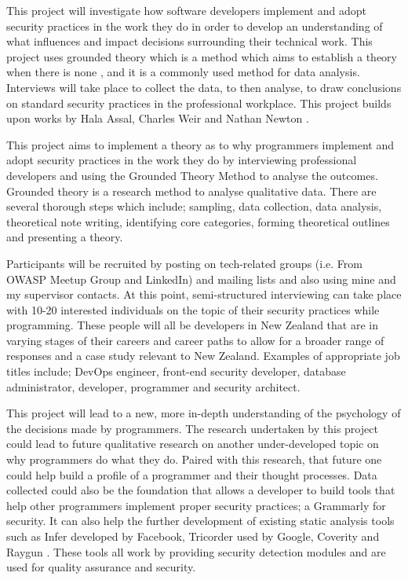 \newline
\par This project will investigate how software developers implement and adopt security practices in the work they do in order to develop an understanding of what influences and impact decisions surrounding their technical work. This project uses grounded theory which is a method which aims to establish a theory when there is none \cite{2}, and it is a commonly used method for data analysis. Interviews will take place to collect the data, to then analyse, to draw conclusions on standard security practices in the professional workplace. This project builds upon works by Hala Assal, Charles Weir and Nathan Newton \cite{summary1, 1, nathan}. 
\newline
\par This project aims to implement a theory as to why programmers implement and adopt security practices in the work they do by interviewing professional developers and using the Grounded Theory Method to analyse the outcomes. Grounded theory is a research method to analyse qualitative data. There are several thorough steps which include; sampling, data collection, data analysis, theoretical note writing, identifying core categories, forming theoretical outlines and presenting a theory.
\newline
\par Participants will be recruited by posting on tech-related groups (i.e. From OWASP Meetup Group and LinkedIn) and mailing lists and also using mine and my supervisor contacts. At this point, semi-structured interviewing can take place with 10-20 interested individuals on the topic of their security practices while programming. These people will all be developers in New Zealand that are in varying stages of their careers and career paths to allow for a broader range of responses and a case study relevant to New Zealand. Examples of appropriate job titles include; DevOps engineer, front-end security developer, database administrator, developer, programmer and security architect.
\newline
\par This project will lead to a new, more in-depth understanding of the psychology of the decisions made by programmers. The research undertaken by this project could lead to future qualitative research on another under-developed topic on why programmers do what they do. Paired with this research, that future one could help build a profile of a programmer and their thought processes. Data collected could also be the foundation that allows a developer to build tools that help other programmers implement proper security practices; a Grammarly for security. It can also help the further development of existing static analysis tools such as Infer developed by Facebook, Tricorder used by Google, Coverity and Raygun \cite{infer, tri, coverity, raygun}. These tools all work by providing security detection modules and are used for quality assurance and security. 
